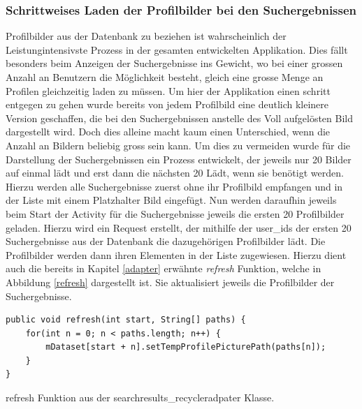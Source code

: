 \documentclass[a4paper,11pt]{report}
\newenvironment{code}{\captionsetup{type=figure}}{}
\begin{document}
		\subsubsection{Schrittweises Laden der Profilbilder bei den Suchergebnissen}
		Profilbilder aus der Datenbank zu beziehen ist wahrscheinlich der Leistungintensivste Prozess in der gesamten entwickelten Applikation. Dies fällt besonders beim Anzeigen der Suchergebnisse ins Gewicht, wo bei einer grossen Anzahl an Benutzern die Möglichkeit besteht, gleich eine grosse Menge an Profilen gleichzeitig laden zu müssen. Um hier der Applikation einen schritt entgegen zu gehen wurde bereits von jedem Profilbild eine deutlich kleinere Version geschaffen, die bei den Suchergebnissen anstelle des Voll aufgelösten Bild dargestellt wird. Doch dies alleine macht kaum einen Unterschied, wenn die Anzahl an Bildern beliebig gross sein kann. Um dies zu vermeiden wurde für die Darstellung der Suchergebnissen ein Prozess entwickelt, der jeweils nur 20 Bilder auf einmal lädt und erst dann die nächsten 20 Lädt, wenn sie benötigt werden. Hierzu werden alle Suchergebnisse zuerst ohne ihr Profilbild empfangen und in der Liste mit einem Platzhalter Bild eingefügt. Nun werden daraufhin jeweils beim Start der Activity für die Suchergebnisse jeweils die ersten 20 Profilbilder geladen. Hierzu wird ein Request erstellt, der mithilfe der user\_ids der ersten 20 Suchergebnisse aus der Datenbank die dazugehörigen Profilbilder lädt. Die Profilbilder werden dann ihren Elementen in der Liste zugewiesen. Hierzu dient auch die bereits in Kapitel \ref{adapter} erwähnte \emph{refresh} Funktion, welche in Abbildung \ref{refresh} dargestellt ist. Sie aktualisiert jeweils die Profilbilder der Suchergebnisse. 
		
\begin{code}
	\begin{center}
		\begin{verbatim}
public void refresh(int start, String[] paths) {
	for(int n = 0; n < paths.length; n++) {
		mDataset[start + n].setTempProfilePicturePath(paths[n]);
	}
}
		\end{verbatim}
	\end{center}
	\caption{refresh Funktion aus der searchresults\_recycleradpater Klasse.}
	\label{refresh}
\end{code}
		
\end{document}
